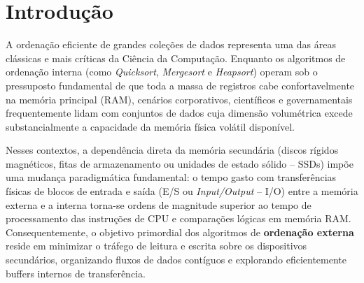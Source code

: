 \documentclass[12pt,a4paper]{article}
\begin{document}
\setcounter{page}{1}

\section{Introdução}
\label{sec:introducao}

A ordenação eficiente de grandes coleções de dados representa uma das áreas clássicas e mais críticas da Ciência da Computação. Enquanto os algoritmos de ordenação interna (como \textit{Quicksort}, \textit{Mergesort} e \textit{Heapsort}) operam sob o pressuposto fundamental de que toda a massa de registros cabe confortavelmente na memória principal (RAM), cenários corporativos, científicos e governamentais frequentemente lidam com conjuntos de dados cuja dimensão volumétrica excede substancialmente a capacidade da memória física volátil disponível.

Nesses contextos, a dependência direta da memória secundária (discos rígidos magnéticos, fitas de armazenamento ou unidades de estado sólido -- SSDs) impõe uma mudança paradigmática fundamental: o tempo gasto com transferências físicas de blocos de entrada e saída (E/S ou \textit{Input/Output} -- I/O) entre a memória externa e a interna torna-se ordens de magnitude superior ao tempo de processamento das instruções de CPU e comparações lógicas em memória RAM. Consequentemente, o objetivo primordial dos algoritmos de \textbf{ordenação externa} reside em minimizar o tráfego de leitura e escrita sobre os dispositivos secundários, organizando fluxos de dados contíguos e explorando eficientemente buffers internos de transferência.
\end{document}
